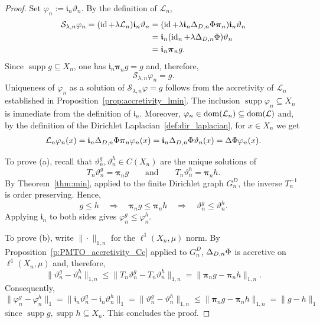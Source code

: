 \documentclass[letterpaper]{article}
\theoremstyle{definition}
\theoremstyle{named}
\numberwithin{equation}{section}
\newcommand{\dom}{\textnormal{dom}} %
\newcommand{\Deltaphi}{\mathcal{L}}
\newcommand{\Lmin}{\mathcal{L}_{n}}
\newcommand{\Deltadir}[1][]{\Delta_{D\ifx&#1&\else,#1\fi}}
\begin{document}
\begin{proof}
{
Set $\varphi_n:=\boldsymbol{\mathfrak i}_n\vartheta_n$. By the definition of $\Lmin$,
\begin{align*}
    \mathcal{S}_{\lambda,n}\varphi_n
=
(\operatorname{id}+\lambda\mathcal L_n)\boldsymbol{\mathfrak i}_n\vartheta_n &=  
(\operatorname{id} + \lambda\boldsymbol{\mathfrak i}_n\Deltadir[n]\Phi\boldsymbol{\pi}_n)\boldsymbol{\mathfrak i}_n\vartheta_n\\
&=
\boldsymbol{\mathfrak i}_n
(\operatorname{id}_n+\lambda\Deltadir[n]\Phi)\vartheta_n\\
&=
\boldsymbol{\mathfrak i}_n\boldsymbol{\pi}_n g.
\end{align*}
Since $\operatorname{supp}g\subseteq X_n$, one has $\boldsymbol{\mathfrak i}_n\boldsymbol{\pi}_n g=g$ and, therefore,
\[
\mathcal{S}_{\lambda,n}\varphi_n=g.
\]
Uniqueness of $\varphi_n$ as a solution of $\mathcal{S}_{\lambda,n}\varphi=g$ follows from the accretivity of $\Lmin$ established in Proposition~\ref{prop:accretivity_lmin}. The inclusion $\operatorname{supp}\varphi_n\subseteq X_n$ is immediate from the definition of $\boldsymbol{\mathfrak i}_n$. Moreover, $\varphi_n\in\dom(\Lmin)\subseteq\dom(\Deltaphi)$ and, by the definition of the Dirichlet Laplacian~\eqref{def:dir_laplacian}, for $x \in X_n$ we get
\begin{align*}
\Lmin\varphi_n(x)
=\boldsymbol{\mathfrak{i}}_n\Deltadir[n]\Phi\boldsymbol{\pi}_n\varphi_n(x)
=\boldsymbol{\mathfrak{i}}_n\Deltadir[n]\Phi\vartheta_n(x)
=\Delta\Phi\varphi_n(x).
\end{align*}

To prove (a), recall that $\vartheta_n^g,\vartheta_n^h\in C(X_n)$ are the unique solutions of
\[
T_n\vartheta_n^g=\boldsymbol{\pi}_n g
\qquad \text{and} \qquad
T_n\vartheta_n^h=\boldsymbol{\pi}_n h.
\]
By Theorem~\ref{thm:min}, applied to the finite Dirichlet graph
$G_n^{D}$,
the inverse $T_n^{-1}$ is order preserving. Hence,
\[
g\le h
\quad\Longrightarrow\quad
\boldsymbol{\pi}_n g\le \boldsymbol{\pi}_n h
\quad\Longrightarrow\quad
\vartheta_n^g\le \vartheta_n^h.
\]
Applying $\boldsymbol{\mathfrak i}_n$ to both sides gives $\varphi_n^g\le\varphi_n^h$.

To prove (b), write $\|\cdot\|_{1,n}$ for the $\ell^1(X_n,\mu)$ norm. By
Proposition~\ref{p:PMTO_accretivity_Cc} applied to $G_n^{D}$,
$\Deltadir[n]\Phi$ is accretive on $\ell^1(X_n,\mu)$ and, therefore,
\[
\|\vartheta_n^g-\vartheta_n^h\|_{1,n}
\le
\|T_n\vartheta_n^g-T_n\vartheta_n^h\|_{1,n}
=
\|\boldsymbol{\pi}_n g-\boldsymbol{\pi}_n h\|_{1,n}.
\]
Consequently,
\[
\|\varphi_n^g-\varphi_n^h\|_1
=
\|\boldsymbol{\mathfrak i}_n\vartheta_n^g-\boldsymbol{\mathfrak i}_n\vartheta_n^h\|_1
=
\|\vartheta_n^g-\vartheta_n^h\|_{1,n}
\le
\|\boldsymbol{\pi}_n g-\boldsymbol{\pi}_n h\|_{1,n}
=
\|g-h\|_1
\]
since $\operatorname{supp}g, \operatorname{supp}h \subseteq X_n$.
This concludes the proof.
}
\end{proof}
\end{document}
